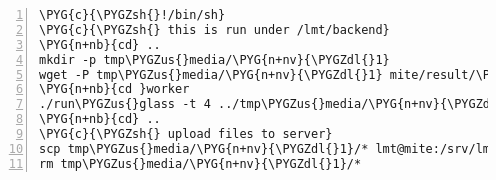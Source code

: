 \begin{Verbatim}[commandchars=\\\{\},numbers=left,stepnumber=1,codes={\catcode`\$=3\catcode`\^=7\catcode`\_=8}]
\PYG{c}{\PYGZsh{}!/bin/sh}
\PYG{c}{\PYGZsh{} this is run under /lmt/backend}
\PYG{n+nb}{cd} ..
mkdir -p tmp\PYGZus{}media/\PYG{n+nv}{\PYGZdl{}1}
wget -P tmp\PYGZus{}media/\PYG{n+nv}{\PYGZdl{}1} mite/result/\PYG{n+nv}{\PYGZdl{}1}/cfg.gls
\PYG{n+nb}{cd }worker
./run\PYGZus{}glass -t 4 ../tmp\PYGZus{}media/\PYG{n+nv}{\PYGZdl{}1}/cfg.gls
\PYG{n+nb}{cd} ..
\PYG{c}{\PYGZsh{} upload files to server}
scp tmp\PYGZus{}media/\PYG{n+nv}{\PYGZdl{}1}/* lmt@mite:/srv/lmt/tmp\PYGZus{}media/\PYG{n+nv}{\PYGZdl{}1}/
rm tmp\PYGZus{}media/\PYG{n+nv}{\PYGZdl{}1}/*
\end{Verbatim}

